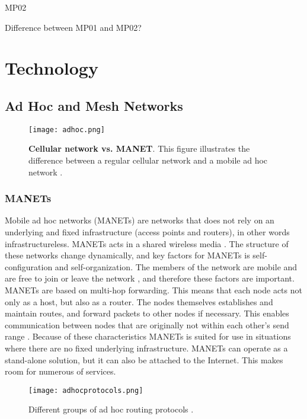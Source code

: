 MP02

Difference between MP01 and MP02?





\section{Technology}

\subsection{Ad Hoc and Mesh Networks}

\begin{figure}[h!]
  \centering
    \texttt{[image: adhoc.png]}
     \caption [Cellular network vs. MANET]{\textbf{Cellular network vs. MANET}. This figure illustrates the difference between a regular cellular network and a mobile ad hoc network \cite{adhoc2}.}
\label{fig:adhoc}
\end{figure}

\subsubsection{MANETs} Mobile ad hoc networks (MANETs) are networks that does not rely on an underlying and fixed infrastructure (access points and routers), in other words infrastructureless. MANETs acts in a shared wireless media \cite{adhoc}. The structure of these networks change dynamically, and key factors for MANETs is self-configuration and self-organization. The members of the network are mobile and are free to join or leave the network \cite{adhoc2}, and therefore these factors are important. MANETs are based on multi-hop forwarding. This means that each node acts not only as a host, but also as a router. The nodes themselves establishes and maintain routes, and forward packets to other nodes if necessary. This enables communication between nodes that are originally not within each other's send range \cite{adhoc2}. Because of these characteristics MANETs is suited for use in situations where there are no fixed underlying infrastructure. MANETs can operate as a stand-alone solution, but it can also be attached to the Internet. This makes room for numerous of services. 

\begin{figure}[h!]
  \centering
    \texttt{[image: adhocprotocols.png]}
     \caption{Different groups of ad hoc routing protocols \cite{adhoc}.}
\label{fig:adhocprotocols}
\end{figure}


